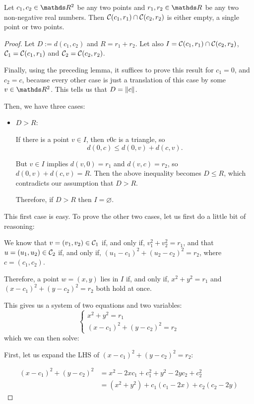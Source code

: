 \begin{cor}
	Let $c_1,c_2\in \R^2$ be any two points and $r_1,r_2\in \R$ be any two non-negative real numbers. Then $\mathcal C(c_1,r_1)\cap\mathcal C(c_2,r_2)$ is either empty, a single point or two points.
\end{cor}
\begin{proof}
	Let $D:=d(c_1,c_2)$ and $R=r_1+r_2$. Let also $I=\mathcal C(c_1,r_1)\cap \mathcal C(c_2,r_2)$, $\mathcal C_1=\mathcal C(c_1,r_1)$ and $\mathcal C_2=\mathcal C(c_2,r_2)$.
	
	Finally, using the preceding lemma, it suffices to prove this result for $c_1=0$, and $c_2=c$, because every other case is just a translation of this case by some $v\in \R^2$. This tells us that $D=\lVert c\rVert$.
	
	Then, we have three cases:
	\begin{itemize}
		\item \underline{$D>R$}:
		
		If there is a point $v\in I$, then $v0c$ is a triangle, so 
		\[d(0,c)\leq d(0,v)+d(c,v).\]
		
		But $v\in I$ implies $d(v,0)=r_1$ and $d(v,c)=r_2$, so $d(0,v)+d(c,v)=R$. Then the above inequality becomes $D\leq R$, which contradicts our assumption that $D>R$.
		
		Therefore, if $D>R$ then $I=\varnothing$.
	\end{itemize}

	This first case is easy. To prove the other two cases, let us first do a little bit of reasoning:
	
	We know that $v=(v_1,v_2)\in \mathcal C_1$ if, and only if, $v_1^2+v_2^2=r_1$, and that $u=(u_1,u_2)\in \mathcal C_2$ if, and only if, $(u_1-c_1)^2+(u_2-c_2)^2=r_2$, where $c=(c_1,c_2)$.
	
	Therefore, a point $w=(x,y)$ lies in $I$ if, and only if, $x^2+y^2=r_1$ and $(x-c_1)^2+(y-c_2)^2=r_2$ both hold at once.
	
	This gives us a system of two equations and two variables:
	\[\begin{cases}
	x^2+y^2=r_1\\
	(x-c_1)^2+(y-c_2)^2=r_2
	\end{cases}\]which we can then solve:
	
	First, let us expand the LHS of $(x-c_1)^2+(y-c_2)^2=r_2$:
	
	\begin{align*}
		(x-c_1)^2+(y-c_2)^2&=x^2-2xc_1+c_1^2+y^2-2yc_2+c_2^2\\
		&=(x^2+y^2)+c_1(c_1-2x)+c_2(c_2-2y)
	\end{align*}
\end{proof}